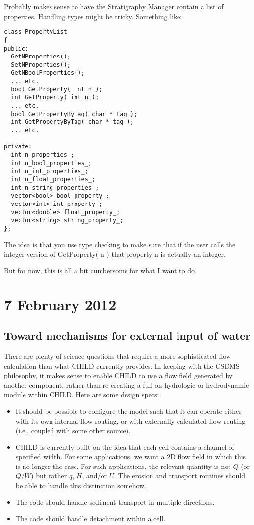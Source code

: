 \documentclass[12pt]{amsart}
\begin{document}
\begin{enumerate}
Probably makes sense to have the Stratigraphy Manager contain a list of properties. Handling types might be tricky. Something like:
\begin{verbatim}
class PropertyList
{
public:
  GetNProperties();
  SetNProperties();
  GetNBoolProperties();
  ... etc.
  bool GetProperty( int n );
  int GetProperty( int n );
  ... etc.
  bool GetPropertyByTag( char * tag );
  int GetPropertyByTag( char * tag );
  ... etc.

private:
  int n_properties_;
  int n_bool_properties_;
  int n_int_properties_;
  int n_float_properties_;
  int n_string_properties_;
  vector<bool> bool_property_;
  vector<int> int_property_;
  vector<double> float_property_;
  vector<string> string_property_;
};
\end{verbatim}
The idea is that you use type checking to make sure that if the user calls the integer version of GetProperty( n ) that property n is actually an integer.

But for now, this is all a bit cumbersome for what I want to do.

  
\end{enumerate}

\section{7 February 2012}

\subsection{Toward mechanisms for external input of water}

There are plenty of science questions that require a more sophisticated flow calculation than what CHILD currently provides. In keeping with the CSDMS philosophy, it makes sense to enable CHILD to use a flow field generated by another component, rather than re-creating a full-on hydrologic or hydrodynamic module within CHILD. Here are some design specs:
\begin{itemize}
\item It should be possible to configure the model such that it can operate either with its own internal flow routing, or with externally calculated flow routing (i.e., coupled with some other source).
\item CHILD is currently built on the idea that each cell contains a channel of specified width. For some applications, we want a 2D flow field in which this is no longer the case. For such applications, the relevant quantity is not $Q$ (or $Q/W$) but rather $q$, $H$, and/or $U$. The erosion and transport routines should be able to handle this distinction somehow.
\item The code should handle sediment transport in multiple directions.
\item The code should handle detachment within a cell.
\end{itemize}
\end{document}
